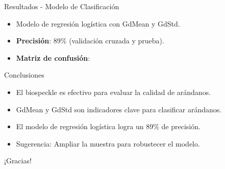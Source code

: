 \documentclass{beamer}
\begin{document}
\begin{frame}{Resultados - Modelo de Clasificación}
    \begin{itemize}
        \item Modelo de regresión logística con GdMean y GdStd.
        \item \textbf{Precisión}: 89\% (validación cruzada y prueba).
        \item \textbf{Matriz de confusión}:
        \centering
    \end{itemize}
\end{frame}

\begin{frame}{Conclusiones}
    \begin{itemize}
        \item El biospeckle es efectivo para evaluar la calidad de arándanos.
        \item GdMean y GdStd son indicadores clave para clasificar arándanos.
        \item El modelo de regresión logística logra un 89\% de precisión.
        \item Sugerencia: Ampliar la muestra para robustecer el modelo.
    \end{itemize}
\end{frame}

\begin{frame}
    \centering
    \Huge{¡Gracias!}
\end{frame}
\end{document}
